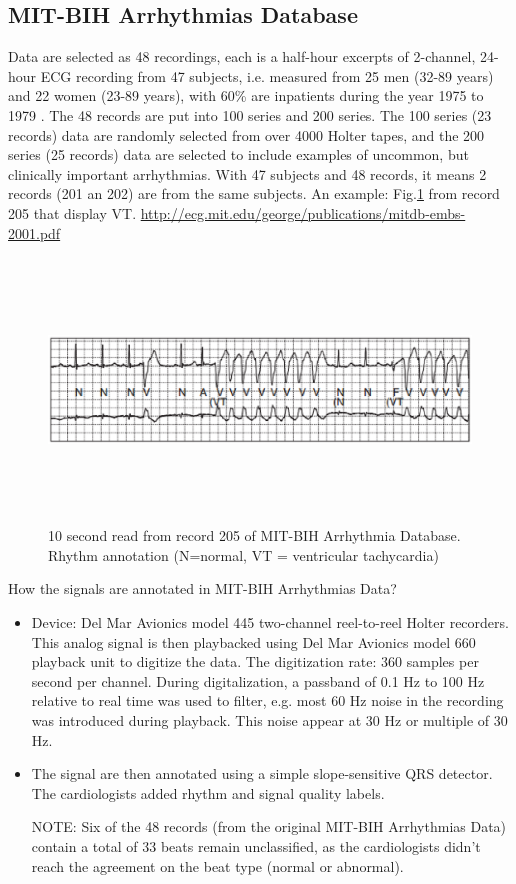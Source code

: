 \subsection{MIT-BIH Arrhythmias Database}
\label{sec:MIT-BIH_Arrhythmias}

Data are selected as 48 recordings, each is a half-hour excerpts of 2-channel,
24-hour ECG recording  from 47 subjects, i.e. measured from 25 men (32-89 years)
and 22 women (23-89  years), with 60\% are inpatients during the year 1975 to
1979  \citep{moody2001}. The 48 records are put into 100 series and 200 series.
The  100 series (23 records) data are randomly selected from over 4000 Holter
tapes, and the 200 series (25 records) data are selected to include examples  of
uncommon, but clinically important arrhythmias. With 47 subjects and 48 
records, it means 2 records (201 an 202) are from the same subjects.
  An example: Fig.\ref{fig:ECG_10sec} from record 205 that display VT.  
\url{http://ecg.mit.edu/george/publications/mitdb-embs-2001.pdf}
    
\begin{figure}[hbt]
 \centerline{\includegraphics[height=7cm]{./images/ECG_10sec.eps}}
 \caption{10 second read from record 205 of MIT-BIH Arrhythmia Database. Rhythm
 annotation (N=normal, VT = ventricular tachycardia)}
\label{fig:ECG_10sec}
\end{figure}

How the signals are annotated in MIT-BIH Arrhythmias Data? 
\begin{itemize}
  \item Device: Del Mar Avionics model 445 two-channel reel-to-reel Holter
  recorders. This analog signal is then playbacked using Del
Mar Avionics model 660 playback unit to digitize the data. The digitization
rate: 360 samples per second per channel. During digitalization, a passband of
0.1 Hz to 100 Hz relative to real time was used to filter, e.g. most 60 Hz noise
in the recording was introduced during playback. This noise appear at 30 Hz or
multiple of 30 Hz.
  
  \item The signal are then annotated using a simple slope-sensitive QRS
  detector. The cardiologists added rhythm and signal quality labels. 
  
NOTE: Six of the 48 records (from the original MIT-BIH Arrhythmias Data) contain
a total of 33 beats remain unclassified, as the cardiologists didn't reach the
agreement on the beat type (normal or abnormal).
\end{itemize}

